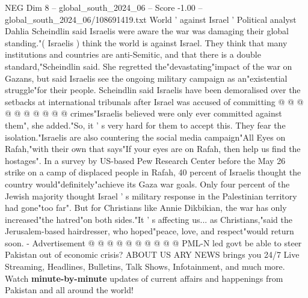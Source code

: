 \begin{textsample}{NEG Dim 8 – global\_south\_2024\_06 – Score -1.00 – global\_south\_2024\_06/108691419.txt}
World ' against Israel ' Political analyst Dahlia Scheindlin said Israelis were aware the war was damaging their global standing."( Israelis ) think the world is against Israel.
They think that many institutions and countries are anti-Semitic, and that there is a double standard,"Scheindlin said.
She regretted the"devastating"impact of the war on Gazans, but said Israelis see the ongoing military campaign as an"existential struggle"for their people.
Scheindlin said Israelis have been demoralised over the setbacks at international tribunals after Israel was accused of committing @ @ @ @ @ @ @ @ @ @ crimes"Israelis believed were only ever committed against them", she added."So, it ' s very hard for them to accept this.
They fear the isolation."Israelis are also countering the social media campaign"All Eyes on Rafah,"with their own that says"If your eyes are on Rafah, then help us find the hostages".
In a survey by US-based Pew Research Center before the May 26 strike on a camp of displaced people in Rafah, 40 percent of Israelis thought the country would"definitely"achieve its Gaza war goals.
Only four percent of the Jewish majority thought Israel ' s military response in the Palestinian territory had gone"too far".
But for Christians like Annie Dikbikian, the war has only increased"the hatred"on both sides."It ' s affecting us... as Christians,"said the Jerusalem-based hairdresser, who hoped"peace, love, and respect"would return soon. - Advertisement @ @ @ @ @ @ @ @ @ @ PML-N led govt be able to steer Pakistan out of economic crisis?
ABOUT US ARY NEWS brings you 24/7 Live Streaming, Headlines, Bulletins, Talk Shows, Infotainment, and much more.
Watch \textbf{minute-by-minute} updates of current affairs and happenings from Pakistan and all around the world!

\end{textsample}
